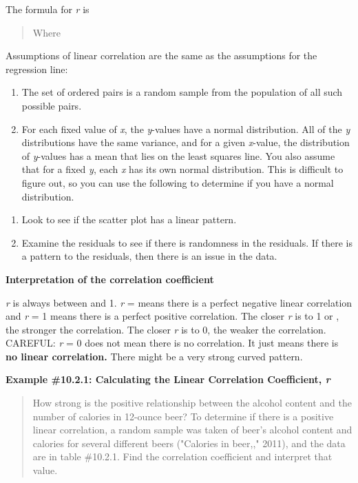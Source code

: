 \documentclass[]{book}
\begin{document}
The formula for \emph{r} is

\begin{quote}
Where
\end{quote}

Assumptions of linear correlation are the same as the assumptions for the regression line:

\begin{enumerate}
\def\labelenumi{\alph{enumi}.}
\item
  The set of ordered pairs is a random sample from the population of all such possible pairs.
\item
  For each fixed value of \emph{x}, the \emph{y}-values have a normal distribution. All of the \emph{y} distributions have the same variance, and for a given \emph{x}-value, the distribution of \emph{y}-values has a mean that lies on the least squares line. You also assume that for a fixed \emph{y}, each \emph{x} has its own normal distribution. This is difficult to figure out, so you can use the following to determine if you have a normal distribution.
\end{enumerate}

\begin{enumerate}
\def\labelenumi{\roman{enumi}.}
\item
  Look to see if the scatter plot has a linear pattern.
\item
  Examine the residuals to see if there is randomness in the residuals. If there is a pattern to the residuals, then there is an issue in the data.
\end{enumerate}

\textbf{Interpretation of the correlation coefficient}

\emph{r} is always between and 1. \emph{r} = means there is a perfect negative linear correlation and \emph{r} = 1 means there is a perfect positive correlation. The closer \emph{r} is to 1 or , the stronger the correlation. The closer \emph{r} is to 0, the weaker the correlation. CAREFUL: \emph{r} = 0 does not mean there is no correlation. It just means there is \textbf{no linear correlation.} There might be a very strong curved pattern.

\textbf{Example \#10.2.1: Calculating the Linear Correlation Coefficient, \emph{r}}

\begin{quote}
How strong is the positive relationship between the alcohol content and the number of calories in 12-ounce beer? To determine if there is a positive linear correlation, a random sample was taken of beer's alcohol content and calories for several different beers ("Calories in beer,," 2011), and the data are in table \#10.2.1. Find the correlation coefficient and interpret that value.
\end{quote}
\end{document}
